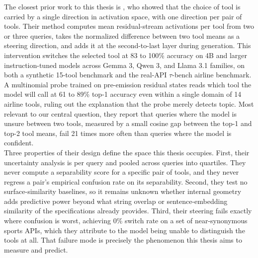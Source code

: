 The closest prior work to this thesis is \textcite{wu2026linearly}, who showed that the choice of tool is carried by a single direction in activation space, with one direction per pair of tools.
Their method computes mean residual-stream activations per tool from two or three queries, takes the normalized difference between two tool means as a steering direction, and adds it at the second-to-last layer during generation.
This intervention switches the selected tool at 83 to 100\% accuracy on 4B and larger instruction-tuned models across Gemma 3, Qwen 3, and Llama 3.1 families, on both a synthetic 15-tool benchmark and the real-API $\tau$-bench airline benchmark.
A multinomial probe trained on pre-emission residual states reads which tool the model will call at 61 to 89\% top-1 accuracy even within a single domain of 14 airline tools, ruling out the explanation that the probe merely detects topic.
Most relevant to our central question, they report that queries where the model is unsure between two tools, measured by a small cosine gap between the top-1 and top-2 tool means, fail 21 times more often than queries where the model is confident.
\\

Three properties of their design define the space this thesis occupies.
First, their uncertainty analysis is per query and pooled across queries into quartiles.
They never compute a separability score for a specific pair of tools, and they never regress a pair's empirical confusion rate on its separability.
Second, they test no surface-similarity baselines, so it remains unknown whether internal geometry adds predictive power beyond what string overlap or sentence-embedding similarity of the specifications already provides.
Third, their steering fails exactly where confusion is worst, achieving 0\% switch rate on a set of near-synonymous sports APIs, which they attribute to the model being unable to distinguish the tools at all.
That failure mode is precisely the phenomenon this thesis aims to measure and predict.
\\

